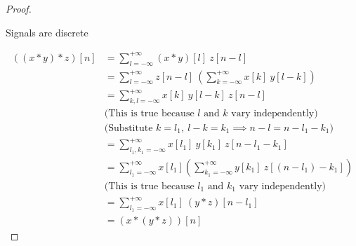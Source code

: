 \begin{proof}
\begin{case}
Signals are discrete
\end{case}
\begin{align}
 \left((x\ast y)\ast z\right)[n] &= \sum_{l=-\infty}^{+\infty}(x\ast y)[l]\ z[n-l] \\
  &= \sum_{l=-\infty}^{+\infty}z[n-l]\ \left(\sum_{k=-\infty}^{+\infty} x[k]\ y[l-k]\right) \nonumber\\
  &= \sum_{k,l=-\infty}^{+\infty}x[k]\ y[l-k]\ z[n-l] \nonumber\\
  &\text{(This is true because $l$ and $k$ vary independently)} \nonumber\\
  &\text{(Substitute $k=l_1 ,\ l-k=k_1 \implies n-l=n-l_1-k_1$)} \nonumber\\
  &= \sum_{l_1,k_1=-\infty}^{+\infty}x[l_1]\ y[k_1]\ z[n-l_1-k_1] \nonumber\\
  &= \sum_{l_1=-\infty}^{+\infty}x[l_1] \left( \sum_{k_1=-\infty}^{+\infty} y[k_1]\ z[(n-l_1)-k_1]\right) \nonumber\\
  &\text{(This is true because $l_1$ and $k_1$ vary independently)} \nonumber\\
  &= \sum_{l_1=-\infty}^{+\infty}x[l_1]\ (y\ast z)[n-l_1] \nonumber\\
 &= \left(x\ast (y\ast z)\right)[n]
\end{align}


\end{proof}
